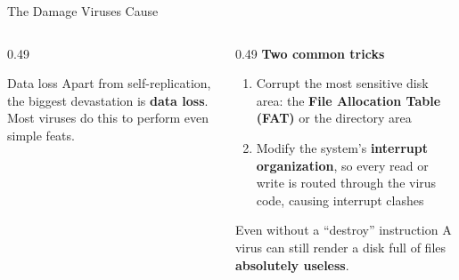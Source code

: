 \documentclass[aspectratio=169,11pt,xcolor={table}]{beamer}
\begin{document}
\begin{frame}{The Damage Viruses Cause}
  \begin{columns}[T]
    \begin{column}{0.49\textwidth}
      \begin{alertblock}{Data loss}
        \small Apart from self-replication, the biggest devastation is \textbf{data loss}. Most viruses do this to perform even simple feats.
      \end{alertblock}
      \centering
    \end{column}
    \begin{column}{0.49\textwidth}
      \textbf{Two common tricks}
      \begin{enumerate}\small\setlength{\itemsep}{4pt}
        \item Corrupt the most sensitive disk area: the \textbf{File Allocation Table (FAT)} or the directory area
        \item Modify the system's \textbf{interrupt organization}, so every read or write is routed through the virus code, causing interrupt clashes
      \end{enumerate}
      \vspace{2mm}
      \begin{block}{Even without a ``destroy'' instruction}
        \small A virus can still render a disk full of files \textbf{absolutely useless}.
      \end{block}
    \end{column}
  \end{columns}
\end{frame}
\end{document}
